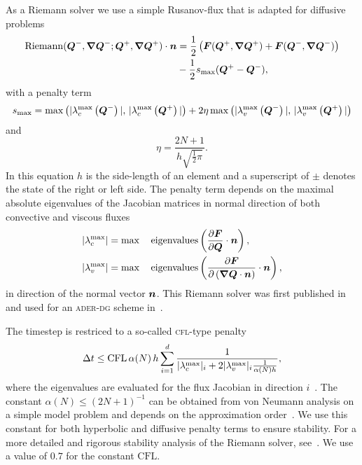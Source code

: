 As a Riemann solver we use a simple Rusanov-flux that is adapted for diffusive problems
\begin{equation}
  \label{eq:rusanov-flux}
  \begin{split}
  \Riemann(\Q^-, \gradQ^-; \Q^+, \gradQ^+) \cdot \normal &=
  \frac{1}{2} \left(
    \flux(\Q^+, \gradQ^+) +
    \flux(\Q^-, \gradQ^-)
  \right)
  \\&-
  \frac{1}{2} s_\text{max} (\Q^+ - \Q^-),
  \end{split}
\end{equation}
with a penalty term
\begin{equation}
  \label{eq:parabolic-penalty}
  s_\text{max}  = \max \left(
\maxConvEigen[\Q^-], \, \maxConvEigen[\Q^+]
\right) +
2 \eta \max \left(
\maxViscEigen[\Q^-], \, \maxViscEigen[\Q^+]
\right)
\end{equation}
and
\begin{equation}
  \eta = \frac{2N+1}{h \sqrt{\frac{1}{2} \pi}}.
\end{equation}
In this equation $h$ is the side-length of an element and a superscript of $\pm$ denotes the state of the right or left side.
The penalty term depends on the maximal absolute eigenvalues of the Jacobian matrices in normal direction of both convective and viscous fluxes
\begin{align}
  \begin{split}
    \maxConvEigen &= \max \quad \operatorname{eigenvalues} \left( \pdv{\flux}{\Q} \cdot \normal  \right),\\
    \maxViscEigen &= \max \quad \operatorname{eigenvalues} \left( \pdv{\flux}{\left( \gradQ \cdot \normal \right)} \cdot \normal \right),
  \end{split}
\end{align}
in direction of the normal vector $\bm{n}$. 
This Riemann solver was first published in~\cite{gassner2008discontinuous} and used for an \textsc{ader-dg} scheme in~\cite{dumbser2010arbitrary}.

The timestep is restriced to a so-called \textsc{cfl}-type penalty
\begin{equation}\label{eq:cfl-aderdg}
 \Delta t \leq  \text{CFL} \, \alpha(N) \, h \sum_{i=1}^{\dimensions} \frac{1}{\maxConvEigen_i + 2 \maxViscEigen_i \frac{1}{\alpha(N) h}},
\end{equation}
where the eigenvalues are evaluated for the flux Jacobian in direction $i$~\cite{dumbser2010arbitrary,gassner2008discontinuous}.
The constant $\alpha(N) \leq {\left( 2N+1  \right)}^{-1}$ can be obtained from von Neumann analysis on a simple model problem and depends on the approximation order~\cite{dumbser2008unified}.
We use this constant for both hyperbolic and diffusive penalty terms to ensure stability.
For a more detailed and rigorous stability analysis of the Riemann solver, see~\cite{gassner2008discontinuous}.
We use a value of $0.7$ for the constant $\text{CFL}$.

